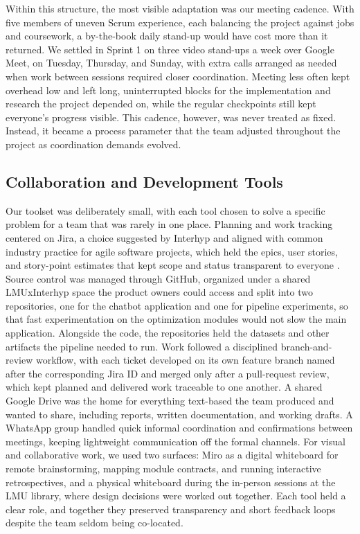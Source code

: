Within this structure, the most visible adaptation was our meeting cadence. With five members of uneven Scrum experience, each balancing the project against jobs and coursework, a by-the-book daily stand-up would have cost more than it returned. We settled in Sprint 1 on three video stand-ups a week over Google Meet, on Tuesday, Thursday, and Sunday, with extra calls arranged as needed when work between sessions required closer coordination. Meeting less often kept overhead low and left long, uninterrupted blocks for the implementation and research the project depended on, while the regular checkpoints still kept everyone's progress visible. This cadence, however, was never treated as fixed. Instead, it became a process parameter that the team adjusted throughout the project as coordination demands evolved.

\subsection{Collaboration and Development Tools}\label{sec:collaboration-tools}

Our toolset was deliberately small, with each tool chosen to solve a specific problem for a team that was rarely in one place. Planning and work tracking centered on Jira, a choice suggested by Interhyp and aligned with common industry practice for agile software projects, which held the epics, user stories, and story-point estimates that kept scope and status transparent to everyone \autocite{avramovska2024jira}. Source control was managed through GitHub, organized under a shared LMUxInterhyp space the product owners could access and split into two repositories, one for the chatbot application and one for pipeline experiments, so that fast experimentation on the optimization modules would not slow the main application. Alongside the code, the repositories held the datasets and other artifacts the pipeline needed to run. Work followed a disciplined branch-and-review workflow, with each ticket developed on its own feature branch named after the corresponding Jira ID and merged only after a pull-request review, which kept planned and delivered work traceable to one another. A shared Google Drive was the home for everything text-based the team produced and wanted to share, including reports, written documentation, and working drafts. A WhatsApp group handled quick informal coordination and confirmations between meetings, keeping lightweight communication off the formal channels. For visual and collaborative work, we used two surfaces: Miro as a digital whiteboard for remote brainstorming, mapping module contracts, and running interactive retrospectives, and a physical whiteboard during the in-person sessions at the LMU library, where design decisions were worked out together. Each tool held a clear role, and together they preserved transparency and short feedback loops despite the team seldom being co-located.

